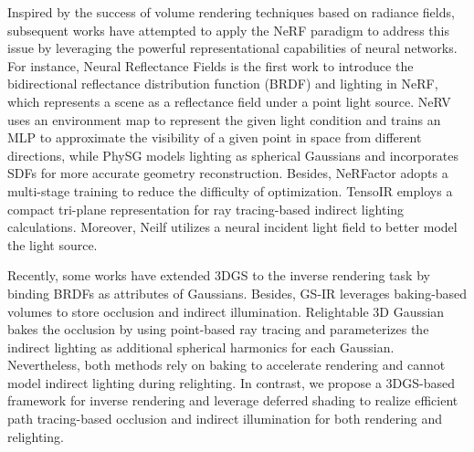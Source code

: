 \documentclass{article} %
\begin{document}
Inspired by the success of volume rendering techniques based on radiance fields, subsequent works \citep{bi2020neural, srinivasan2021nerv, boss2021nerd, zhang2021nerfactor, jin2023tensoir, zhang2021physg, invrender,  yao2022neilf} have attempted to apply the NeRF paradigm to address this issue by leveraging the powerful representational capabilities of neural networks. For instance, Neural Reflectance Fields \citep{bi2020neural} is the first work to introduce the bidirectional reflectance distribution function (BRDF) and lighting in NeRF, which represents a scene as a reflectance field under a point light source. NeRV \citep{srinivasan2021nerv} uses an environment map to represent the given light condition and trains an MLP to approximate the visibility of a given point in space from different directions, while PhySG \citep{zhang2021physg} models lighting as spherical Gaussians and incorporates SDFs for more accurate geometry reconstruction. Besides, NeRFactor \citep{zhang2021nerfactor} adopts a multi-stage training to reduce the difficulty of optimization. TensoIR \citep{jin2023tensoir} employs a compact tri-plane representation for ray tracing-based indirect lighting calculations. Moreover, Neilf \citep{yao2022neilf} utilizes a neural incident light field to better model the light source. 

Recently, some works \citep{jiang2024gaussianshader, wu2024deferredgs} have extended 3DGS to the inverse rendering task by binding BRDFs as attributes of Gaussians. Besides, GS-IR \citep{gsir} leverages baking-based volumes to store occlusion and indirect illumination. Relightable 3D Gaussian \citep{relightable} bakes the occlusion by using point-based ray tracing and parameterizes the indirect lighting as additional spherical harmonics for each Gaussian. Nevertheless, both methods rely on baking to accelerate rendering and cannot model indirect lighting during relighting. In contrast, we propose a 3DGS-based framework for inverse rendering and leverage deferred shading to realize efficient path tracing-based occlusion and indirect illumination for both rendering and relighting.
\end{document}
